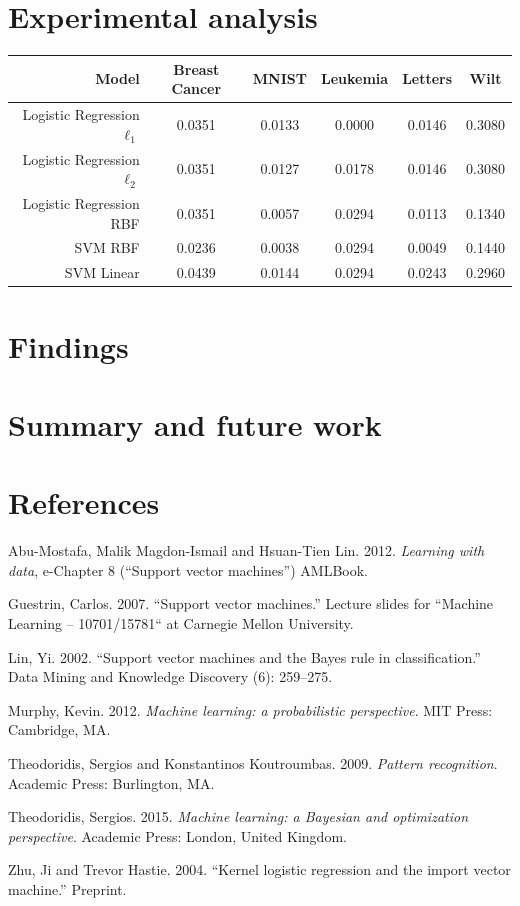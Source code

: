 \documentclass[letterpaper, 12pt]{article}
\begin{document}
\section{Experimental analysis}
\begin{center}
  \begin{tabular}{r|c c c c c}
     Model & Breast Cancer & MNIST & Leukemia & Letters & Wilt \\
     \hline
      Logistic Regression $\ell_1$ & 0.0351 & 0.0133 & 0.0000 & 0.0146 & 0.3080 \\
      Logistic Regression $\ell_2$ & 0.0351 & 0.0127 & 0.0178 & 0.0146 & 0.3080 \\
      Logistic Regression RBF      & 0.0351 & 0.0057 & 0.0294 & 0.0113 & 0.1340 \\
      SVM RBF                      & 0.0236 & 0.0038 & 0.0294 & 0.0049 & 0.1440 \\
      SVM Linear                   & 0.0439 & 0.0144 & 0.0294 & 0.0243 & 0.2960 \\
\end{tabular}
\end{center}

\section{Findings}

\section{Summary and future work}

\section{References}

Abu-Mostafa, Malik Magdon-Ismail and Hsuan-Tien Lin. 2012. \emph{Learning with data}, e-Chapter 8 (``Support vector machines'') AMLBook.

Guestrin, Carlos. 2007. ``Support vector machines.'' Lecture slides for ``Machine Learning – 10701/15781`` at Carnegie Mellon University. 

Lin, Yi. 2002. ``Support vector machines and the Bayes rule in classification.'' Data Mining and Knowledge Discovery (6): 259–275.

Murphy, Kevin. 2012. \emph{Machine learning: a probabilistic perspective}. MIT Press: Cambridge, MA.

Theodoridis, Sergios and Konstantinos Koutroumbas. 2009. \emph{Pattern recognition}. Academic Press: Burlington, MA.

Theodoridis, Sergios. 2015. \emph{Machine learning: a Bayesian and optimization perspective}. Academic Press: London, United Kingdom.

Zhu, Ji and Trevor Hastie. 2004. ``Kernel logistic regression and the import vector machine.'' Preprint.
\end{document}
